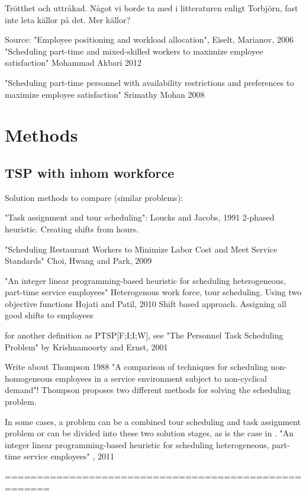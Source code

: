 Trötthet och uttråkad. Något vi borde ta med i litteraturen enligt Torbjörn, fast inte leta källor på det. Mer källor?


Source: "Employee positioning and workload allocation", Eiselt, Marianov, 2006
"Scheduling part-time and mixed-skilled workers to maximize employee satisfaction" Mohammad Akbari 2012

"Scheduling part-time personnel with availability restrictions and preferences to maximize employee satisfaction" Srimathy Mohan 2008


\section{Methods}
\subsection{TSP with inhom workforce}

Solution methods to compare (similar problems):

"Task assignment and tour scheduling": Loucks and Jacobs, 1991
2-phased heuristic. Creating shifts from hours.


"Scheduling Restaurant Workers to Minimize Labor Cost and Meet Service Standards" Choi, Hwang and Park, 2009

"An integer linear programming-based heuristic for scheduling heterogeneous, part-time service employees" Heterogenous work force, tour scheduling. Using two objective functions Hojati and Patil, 2010 
Shift based approach. Assigning all good shifts to employees

for another definition as PTSP[F;I;I;W], see "The Personnel Task Scheduling Problem" by Krishnamoorty and Ernst, 2001

Write about Thompson 1988 "A comparison of techniques for scheduling non-homogeneous employees in a service environment subject to non-cyclical demand"! Thompson proposes two different methods for solving the scheduling problem.

In some cases, a problem can be a combined tour scheduling and task assignment problem or can be divided into these two solution stages, as is the case in \cite{keylist}. "An integer linear programming-based heuristic for scheduling heterogeneous, part-time service employees" , 2011

=====================================================

